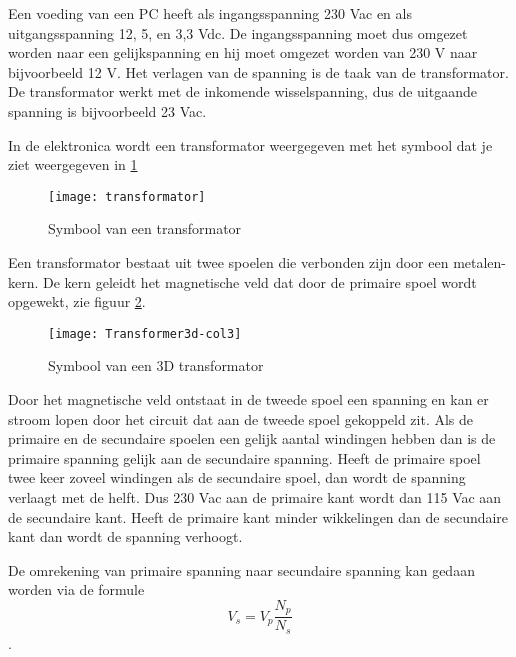 Een voeding van een PC heeft als ingangsspanning 230 Vac en als uitgangsspanning 12, 5, en 3,3 Vdc. De ingangsspanning moet dus omgezet worden naar een gelijkspanning en hij moet omgezet worden van 230 V naar bijvoorbeeld 12 V. Het verlagen van de spanning is de taak van de transformator. De transformator werkt met de inkomende wisselspanning, dus de uitgaande spanning is bijvoorbeeld 23 Vac.

In de elektronica wordt een transformator weergegeven met het symbool dat je ziet weergegeven in \ref{symbool:transformator}

\begin{figure}[h]
\texttt{[image: transformator]}
\centering
\caption{Symbool van een transformator}
\label{symbool:transformator}
\end{figure}

Een transformator bestaat uit twee spoelen die verbonden zijn door een metalen-kern. De kern geleidt het magnetische veld dat door de primaire spoel wordt opgewekt, zie figuur \ref{fig:transformator3D}.

\begin{figure}[h]
\texttt{[image: Transformer3d-col3]}
\centering
\caption{Symbool van een 3D transformator}
\label{fig:transformator3D}
\end{figure}

Door het magnetische veld ontstaat in de tweede spoel een spanning en kan er stroom lopen door het circuit dat aan de tweede spoel gekoppeld zit. Als de primaire en de secundaire spoelen een gelijk aantal windingen hebben dan is de primaire spanning gelijk aan de secundaire spanning. Heeft de primaire spoel twee keer zoveel windingen als de secundaire spoel, dan wordt de spanning verlaagt met de helft. Dus 230 Vac aan de primaire kant wordt dan 115 Vac aan de secundaire kant. Heeft de primaire kant minder wikkelingen dan de secundaire kant dan wordt de spanning verhoogt.

De omrekening van primaire spanning naar secundaire spanning kan gedaan worden via de formule \[ V_s = V_p \frac{N_p}{N_s} \].

